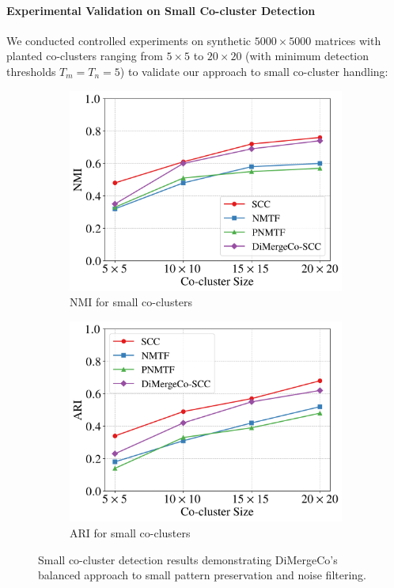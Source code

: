 \documentclass{ar2rc}
\theoremstyle{definition}
\theoremstyle{remark} %
\begin{document}
\paragraph{Experimental Validation on Small Co-cluster Detection}
We conducted controlled experiments on synthetic $5000 \times 5000$ matrices with planted co-clusters ranging from $5 \times 5$ to $20 \times 20$ (with minimum detection thresholds $T_m = T_n = 5$) to validate our approach to small co-cluster handling:

\begin{figure}[t]
  \centering
  \begin{subfigure}[b]{0.48\textwidth}
    \centering
    \includegraphics[width=\linewidth]{images/nmi_small.png}
    \caption{NMI for small co-clusters}
  \end{subfigure}
  \hfill
  \begin{subfigure}[b]{0.48\textwidth}
    \centering
    \includegraphics[width=\linewidth]{images/ari_small.png}
    \caption{ARI for small co-clusters}
  \end{subfigure}
  \caption{Small co-cluster detection results demonstrating DiMergeCo's balanced approach to small pattern preservation and noise filtering.}
\end{figure}
\end{document}
